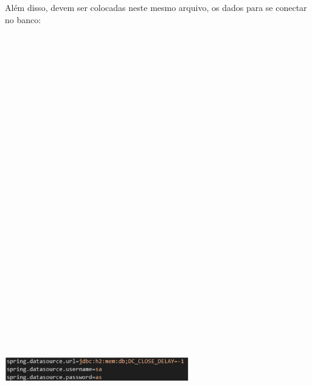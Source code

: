 \documentclass[conference]{IEEEtran}
\begin{document}
Além disso, devem ser colocadas neste mesmo arquivo, os dados para se conectar no banco:

\vspace{7mm}
\centerline{\includegraphics[width=80mm,height=600mm,keepaspectratio]{Postegresql.png}}
\vspace{7mm}
\end{document}
